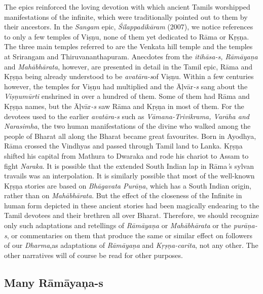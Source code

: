 The epics reinforced the loving devotion with which ancient Tamils worshipped manifestations of the infinite, which were traditionally pointed out to them by their ancestors. In the \textit{Sangam} epic, \textit{Śilappadikāram} (2007), we notice references to only a few temples of Viṣṇu, none of them yet dedicated to Rāma or Kṛṣṇa. The three main temples referred to are the Venkata hill temple and the temples at Srirangam and Thiruvananthapuram. Anecdotes from the \textit{itihāsa-s, Rāmāyaṇa} and \textit{Mahābhārata}, however, are presented in detail in the Tamil epic, Rāma and Kṛṣṇa being already understood to be \textit{avatāra-s}\break of Viṣṇu. Within a few centuries however, the temples for Viṣṇu had multiplied and the Āļvār\textit{-s} sang about the \textit{Viṣṇumūrti} enshrined in over a hundred of them. Some of them had Rāma and Kṛṣṇa names, but the Āļvār\textit{-s} saw Rāma and Kṛṣṇa in most of them. For the devotees used to the earlier \textit{avatāra-s} such as \textit{Vāmana-Trivikrama, Varāha and Narasimha}, the two human manifestations of the divine who walked among the people of Bharat all along the Bharat became great favourites. Born in Ayodhya, Rāma crossed the Vindhyas and passed through Tamil land to Lanka. Kṛṣṇa shifted his capital from Mathura to Dwaraka and rode his chariot to Assam to fight \textit{Naraka}. It is possible that the extended South Indian lap in Rāma\textit{’}s sylvan travails was an interpolation. It is similarly possible that most of the well-known Kṛṣṇa stories are based on \textit{Bhāgavata Purāṇa}, which has a South Indian origin, rather than on \textit{Mahābhārata}. But the effect of the closeness of the Infinite in human form depicted in these ancient stories had been magically endearing to the Tamil devotees and their brethren all over Bharat. Therefore, we should recognize only such adaptations and retellings of \textit{Rāmāyaṇa} or \textit{Mahābhārata} or the \textit{purāṇa-s}, or commentaries on them that produce the same or similar effect on followers of our \textit{Dharma},as adaptations of \textit{Rāmāyaṇa} and \textit{Kṛṣṇa-carita}, not any other. The other narratives will of course be read for other purposes.


\subsection*{Many Rāmāyaņa-s}

